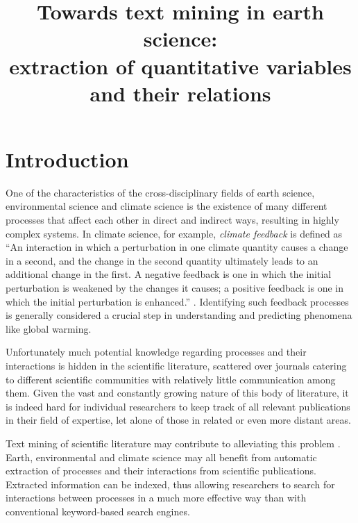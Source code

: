 \documentclass[10pt, a4paper]{article}
\title{Towards text mining in earth science:\\
extraction of quantitative variables and their relations}
\begin{document}
\maketitleabstract

\section{Introduction}

One of the characteristics of the cross-disciplinary fields of earth science, environmental science and climate science is the existence of many different processes that affect each other in direct and indirect ways, resulting in highly complex systems.
In climate science, for example, \emph{climate feedback} is defined as ``An interaction in which a perturbation in one climate quantity causes a change in a second, and the change in the
second quantity ultimately leads to an additional change in the first. 
A negative feedback is one in which the initial perturbation is weakened
by the changes it causes; a positive feedback is one in which the initial
perturbation is enhanced.'' \cite{stocker2013climate}.
Identifying such feedback processes is generally considered a crucial step in understanding and predicting phenomena like global warming.

Unfortunately much potential knowledge regarding processes and their interactions is hidden in the scientific literature, scattered over journals catering to different scientific communities with relatively little communication among them.
Given the vast and constantly growing nature of this body of literature, it is indeed hard for individual researchers to keep track of all relevant publications in their field of expertise, let alone of those in related or even more distant areas.   

Text mining of scientific literature may contribute to alleviating this problem \cite{Etzioni2011Search}.
Earth, environmental and climate science may all benefit from automatic extraction of processes and their interactions from scientific publications.
Extracted information can be indexed, thus allowing researchers to search for interactions between processes in a much more effective way than with conventional keyword-based search engines.
\end{document}
